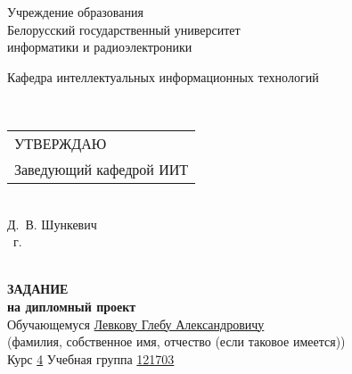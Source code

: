 {
  \thispagestyle{empty}
  \setlength{\parindent}{0em}

  \newcommand{\lineunderscore}{\uline{\hspace*{\fill}}}

  \begin{center}
    Учреждение образования\\
    Белорусский государственный университет\\
    информатики и радиоэлектроники\\[0.5em]
  

  \begin{minipage}{\textwidth}
      Кафедра интеллектуальных информационных технологий
  \end{minipage}\\[2em]

  \begin{minipage}{\textwidth}
    \begin{flushright}
      \begin{tabular}{@{}l@{}}
        УТВЕРЖДАЮ\\[0.5em]
        Заведующий кафедрой ИИТ
      \end{tabular}\\[0.7em]
      \underline{\hspace*{5.3em}} Д.~В. Шункевич\\ [0.5em]
      \underline{\hspace*{1.9em}} \underline{\hspace*{7.8em}} \the\year{}~г.
    \end{flushright}
  \end{minipage}\\[2em]

  \textbf{ЗАДАНИЕ} \\
  \textbf{на дипломный проект}\\[1em]

  Обучающемуся \uline{\hspace*{2em}}\uline{Левкову Глебу Александровичу}\lineunderscore \\
  {\footnotesize\hspace{9em}(фамилия, собственное имя, отчество (если таковое имеется))}\\
  
  Курс \uline{4\hspace*{2em}} Учебная группа \uline{121703}\lineunderscore\\[0.5em]
  

\end{center}}
